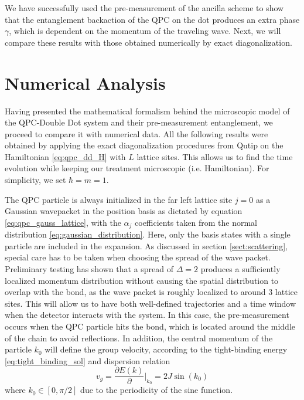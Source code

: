 \documentclass{article}
\begin{document}
We have successfully used the pre-measurement of the ancilla scheme to show that the
entanglement backaction of the QPC on the dot produces an extra phase $\gamma$, which is dependent 
on the momentum of the traveling wave. 
Next, we will compare these results with those obtained numerically by exact 
diagonalization. 


\section{Numerical Analysis}\label{sect:numerical_analysis}

Having presented the mathematical formalism behind the microscopic model of the QPC-Double Dot system
and their pre-measurement entanglement, we proceed to compare it with numerical data. All the following results were obtained by applying the exact diagonalization procedures from Qutip 
on the Hamiltonian \eqref{eq:qpc_dd_H} with $L$ lattice sites. 
This allows us to find the time evolution
while keeping our treatment microscopic (i.e. Hamiltonian). For simplicity, we set $\hbar = m =1$.

The QPC particle is always initialized in the far left lattice site $j=0$ as a Gaussian wavepacket
in the position basis as dictated by equation \eqref{eq:qpc_gauss_lattice}, with the $\alpha_j$
coefficients taken from the normal distribution \eqref{eq:gaussian_distribution}. Here,
only the basis states with a single particle are included in the expansion. As discussed in section
\ref{sect:scattering}, special care has to be taken when choosing the spread of the wave packet. 
Preliminary testing has shown that a spread of $\Delta =2$ produces a sufficiently localized 
momentum distribution without causing the spatial distribution to overlap with the bond, as the 
wave packet is roughly localized to around 3 lattice sites. This will allow us to have both well-defined trajectories and a time window when the detector interacts with the 
system. In this case, 
the pre-measurement occurs when the QPC particle hits the bond, which is located around the
middle of the chain to avoid reflections. 
In addition, the central momentum of the particle $k_0$ will define the
group velocity, according to the tight-binding energy \eqref{eq:tight_binding_sol} and 
dispersion relation
\begin{equation}
    v_g = \frac{\partial E(k)}{\partial}\Big|_{k_0} = 2 J \sin(k_0)
\end{equation}
where $k_0\in[0,\pi/2]$ due to the periodicity of the sine function.
\end{document}
